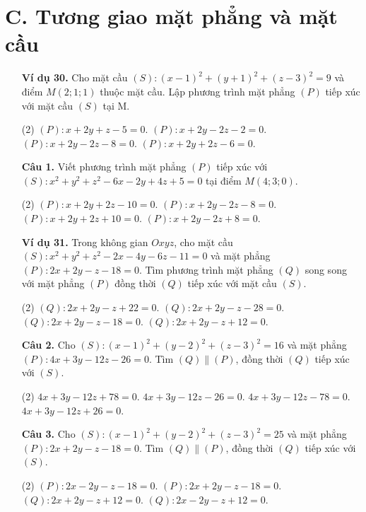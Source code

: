 \documentclass[12pt, a4paper]{article}
\begin{document}
\section*{C. Tương giao mặt phẳng và mặt cầu}
\begin{enumerate}[label=\textbf{\arabic*.}, wide=0pt, leftmargin=*]
    \item[\textbf{Ví dụ 30.}] Cho mặt cầu \((S): (x-1)^2 + (y+1)^2 + (z-3)^2 = 9\) và điểm \(M(2;1;1)\) thuộc mặt cầu. Lập phương trình mặt phẳng \((P)\) tiếp xúc với mặt cầu \((S)\) tại M.
    \begin{tasks}(2)
        \task \((P): x+2y+z-5=0\).
        \task \((P): x+2y-2z-2=0\).
        \task \((P): x+2y-2z-8=0\).
        \task \((P): x+2y+2z-6=0\).
    \end{tasks}
    
    \item[\textbf{Câu 1.}] Viết phương trình mặt phẳng \((P)\) tiếp xúc với \((S): x^2+y^2+z^2-6x-2y+4z+5=0\) tại điểm \(M(4;3;0)\).
    \begin{tasks}(2)
        \task \((P): x+2y+2z-10=0\).
        \task \((P): x+2y-2z-8=0\).
        \task \((P): x+2y+2z+10=0\).
        \task \((P): x+2y-2z+8=0\).
    \end{tasks}
    
    \item[\textbf{Ví dụ 31.}] Trong không gian \(Oxyz\), cho mặt cầu \((S): x^2+y^2+z^2-2x-4y-6z-11=0\) và mặt phẳng \((P): 2x+2y-z-18=0\). Tìm phương trình mặt phẳng \((Q)\) song song với mặt phẳng \((P)\) đồng thời \((Q)\) tiếp xúc với mặt cầu \((S)\).
    \begin{tasks}(2)
        \task \((Q): 2x+2y-z+22=0\).
        \task \((Q): 2x+2y-z-28=0\).
        \task \((Q): 2x+2y-z-18=0\).
        \task \((Q): 2x+2y-z+12=0\).
    \end{tasks}
    
    
    \item[\textbf{Câu 2.}] Cho \((S): (x-1)^2+(y-2)^2+(z-3)^2 = 16\) và mặt phẳng \((P): 4x+3y-12z-26=0\). Tìm \((Q)\parallel(P)\), đồng thời \((Q)\) tiếp xúc với \((S)\).
    \begin{tasks}(2)
        \task \(4x+3y-12z+78=0\).
        \task \(4x+3y-12z-26=0\).
        \task \(4x+3y-12z-78=0\).
        \task \(4x+3y-12z+26=0\).
    \end{tasks}
    
    \item[\textbf{Câu 3.}] Cho \((S): (x-1)^2+(y-2)^2+(z-3)^2 = 25\) và mặt phẳng \((P): 2x+2y-z-18=0\). Tìm \((Q)\parallel(P)\), đồng thời \((Q)\) tiếp xúc với \((S)\).
    \begin{tasks}(2)
        \task \((P): 2x-2y-z-18=0\).
        \task \((P): 2x+2y-z-18=0\).
        \task \((Q): 2x+2y-z+12=0\).
        \task \((Q): 2x-2y-z+12=0\).
    \end{tasks}
    

\end{enumerate}
\end{document}
